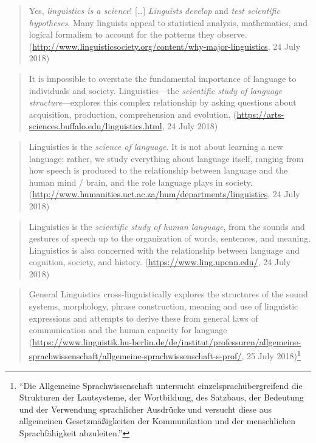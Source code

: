 \documentclass[output=paper]{langscibook}
\begin{document}
\begin{quotation}
Yes, \emph{linguistics is a science}! […] \emph{Linguists develop} and \emph{test scientific hypotheses}. Many linguists appeal to statistical analysis, mathematics, and logical formalism to account for the patterns they observe. (\url{http://www.linguisticsociety.org/content/why-major-linguistics}, 24 July 2018)
\end{quotation}

\begin{quotation}
It is impossible to overstate the fundamental importance of language to individuals and society. Linguistics—the \emph{scientific study of language structure}—explores this complex relationship by asking questions about acquisition, production, comprehension and evolution. (\url{https://arts-sciences.buffalo.edu/linguistics.html}, 24 July 2018)
\end{quotation}

\begin{quotation}
Linguistics is the \emph{science of language}. It is not about learning a new language; rather, we study everything about language itself, ranging from how speech is produced to the relationship between language and the human mind / brain, and the role language plays in society. (\url{http://www.humanities.uct.ac.za/hum/departments/linguistics}, 24 July 2018)
\end{quotation}

\begin{quotation}
Linguistics is the \emph{scientific study of human language}, from the sounds and gestures of speech up to the organization of words, sentences, and meaning. Linguistics is also concerned with the relationship between language and cognition, society, and history. (\url{https://www.ling.upenn.edu/}, 24 July 2018)
\end{quotation}

\begin{quotation}
General Linguistics cross-linguistically explores the structures of the sound systems, morphology, phrase construction, meaning and use of linguistic expressions and attempts to derive these from general laws of communication and the human capacity for language (\url{https://www.linguistik.hu-berlin.de/de/institut/professuren/allgemeine-sprachwissenschaft/allgemeine-sprachwissenschaft-s-prof/}, 25 July 2018)\footnote{``Die Allgemeine Sprachwissenschaft untersucht einzelsprachübergreifend die Strukturen der Lautsysteme, der Wortbildung, des Satzbaus, der Bedeutung und der Verwendung sprachlicher Ausdrücke und versucht diese aus allgemeinen Gesetzmäßigkeiten der Kommunikation und der menschlichen Sprachfähigkeit abzuleiten.''}
\end{quotation}
\end{document}
